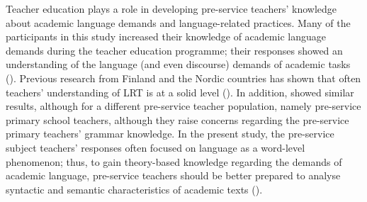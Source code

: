 \documentclass[output=paper]{langscibook}
\begin{document}
Teacher education plays a role in developing pre-service teachers’ knowledge about academic language demands and language-related practices. Many of the participants in this study increased their knowledge of academic language demands during the teacher education programme; their responses showed an understanding of the language (and even discourse) demands of academic tasks (\citealt{Cummins2000,Gibbons2014,Schleppegrell2002}). Previous research from Finland and the Nordic countries has shown that often teachers’ understanding of LRT is at a solid level (\citealt{AlisaariEtAl2019,Alisaari2020_Apples,Iversen2021,Lundberg2019}). In addition, \citet{chapters/7_alisaari} showed similar results, although for a different pre-service teacher population, namely pre-service primary school teachers, although they raise concerns regarding the pre-service primary teachers’ grammar knowledge. In the present study, the pre-service subject teachers’ responses often focused on language as a word-level phenomenon; thus, to gain theory-based knowledge regarding the demands of academic language, pre-service teachers should be better prepared to analyse syntactic and semantic characteristics of academic texts (\citealt{Cummins2000}).
\end{document}
